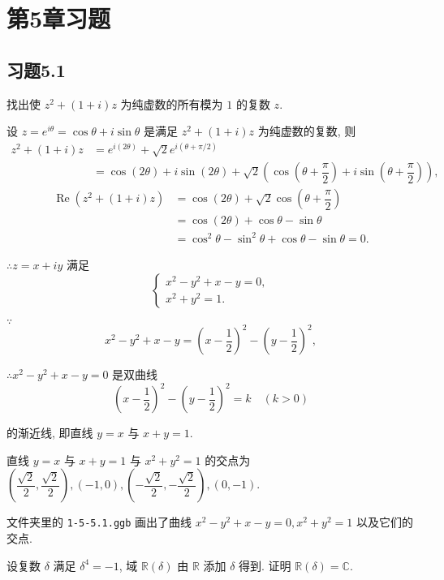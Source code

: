 \documentclass[UTF8]{ctexart}
\begin{document}
\section{第5章习题}
\subsection{习题5.1}
\begin{exercise}[1.1]
    找出使 $z^2+(1+i)z$ 为纯虚数的所有模为 $1$ 的复数 $z$.
\end{exercise}
\begin{solution}
    设 $z=e^{i\theta}=\cos\theta+i\sin\theta$ 是满足 $z^2+(1+i)z$ 为纯虚数的复数, 则
    \begin{align*}
        z^2+(1+i)z & =e^{i(2\theta)}+\sqrt{2}e^{i(\theta+\pi/2)} \\
        & =\cos(2\theta)+i\sin(2\theta)+\sqrt{2}\left(\cos\left(\theta+\dfrac{\pi}{2}\right)+i\sin\left(\theta+\dfrac{\pi}{2}\right)\right),
    \end{align*}
    \begin{align*}
        \operatorname{Re}(z^2+(1+i)z) & =\cos(2\theta)+\sqrt{2}\cos\left(\theta+\dfrac{\pi}{2}\right) \\
        & =\cos(2\theta)+\cos\theta-\sin\theta \\
        & =\cos^2\theta-\sin^2\theta+\cos\theta-\sin\theta=0.
    \end{align*}
    
    $\therefore z=x+iy$ 满足
    \[\begin{cases}
        x^2-y^2+x-y=0, \\
        x^2+y^2=1.
    \end{cases}\]

    $\because$
    \[x^2-y^2+x-y=\left(x-\dfrac{1}{2}\right)^2-\left(y-\dfrac{1}{2}\right)^2,\]

    $\therefore x^2-y^2+x-y=0$ 是双曲线
    \[\left(x-\dfrac{1}{2}\right)^2-\left(y-\dfrac{1}{2}\right)^2=k\quad(k>0)\]

    的渐近线, 即直线 $y=x$ 与 $x+y=1$.

    直线 $y=x$ 与 $x+y=1$ 与 $x^2+y^2=1$ 的交点为 $\left(\dfrac{\sqrt{2}}{2},\dfrac{\sqrt{2}}{2}\right),(-1,0),\left(-\dfrac{\sqrt{2}}{2},-\dfrac{\sqrt{2}}{2}\right),(0,-1)$.

    文件夹里的 \verb|1-5-5.1.ggb| 画出了曲线 $x^2-y^2+x-y=0,x^2+y^2=1$ 以及它们的交点.
\end{solution}
\begin{exercise}[1.2]
    设复数 $\delta$ 满足 $\delta^4=-1$, 域 $\mathbb{R}(\delta)$ 由 $\mathbb{R}$ 添加 $\delta$ 得到. 证明 $\mathbb{R}(\delta)=\mathbb{C}$.
\end{exercise}
\end{document}
